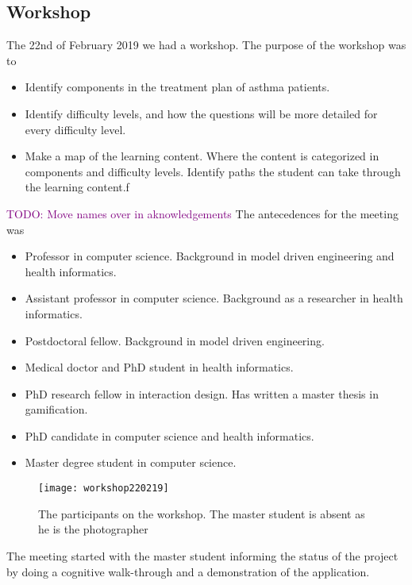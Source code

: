 \subsection{Workshop}
The 22nd of February 2019 we had a workshop. The purpose of the workshop was to
\begin{itemize}
	\item Identify components in the treatment plan of asthma patients.
	\item Identify difficulty levels, and how the questions will be more detailed for every difficulty level.
	\item Make a map of the learning content. Where the content is categorized in components and difficulty levels.  Identify paths the student can take through the learning content.f 
\end{itemize}

\textcolor{purple}{TODO: Move names over in aknowledgements}
The antecedences for the meeting was 
\begin{itemize}
	\item Professor in computer science. Background in model driven engineering and health informatics.
	\item Assistant professor in computer science. Background as a researcher in health informatics.
	\item Postdoctoral fellow. Background in model driven engineering.
	\item Medical doctor and PhD student in health informatics.
	\item PhD research fellow in interaction design. Has written a master thesis in gamification.
	\item PhD candidate in computer science and health informatics.
	\item Master degree student in computer science.	
\end{itemize}

\begin{figure}[h!]
	\texttt{[image: workshop220219]}
		\caption {The participants on the workshop. The master student is absent as he is the photographer}
\end{figure}

The meeting started with the master student informing the status of the project by doing a cognitive walk-through and a demonstration of the application. 

